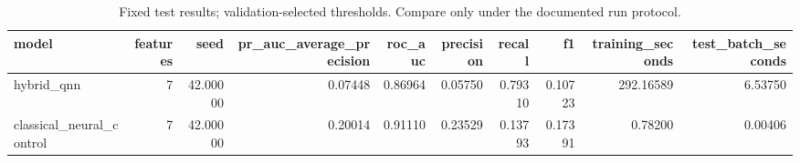 \begin{table}
\caption{Fixed test results; validation-selected thresholds. Compare only under the documented run protocol.}
\begin{tabular}{lrrrrrrrrr}
\toprule
model & features & seed & pr\_auc\_average\_precision & roc\_auc & precision & recall & f1 & training\_seconds & test\_batch\_seconds \\
\midrule
hybrid\_qnn & 7 & 42.00000 & 0.07448 & 0.86964 & 0.05750 & 0.79310 & 0.10723 & 292.16589 & 6.53750 \\
classical\_neural\_control & 7 & 42.00000 & 0.20014 & 0.91110 & 0.23529 & 0.13793 & 0.17391 & 0.78200 & 0.00406 \\
\bottomrule
\end{tabular}
\end{table}
